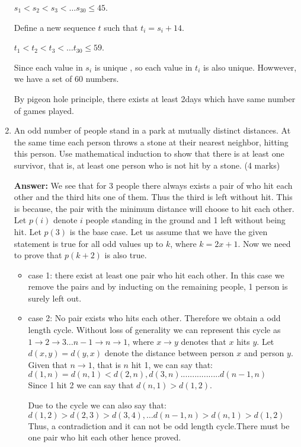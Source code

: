 \documentclass[a4paper]{article}
\begin{document}
\begin{enumerate}
$s_1 < s_2 < s_3 < \dots s_30 \leq 45$.

Define a new sequence $t$ such that $t_i=s_i+14$.

$t_1 < t_2 < t_3 < \dots t_30 \leq 59$.

Since each value in $s_i$ is unique , so each value in $t_i$ is also unique. Howwever, we have a set of  60 numbers.

By pigeon hole principle, there exists at least 2days which have same number of games played.

\item An odd number of people stand  in a park  at  mutually distinct distances.
At the  same time  each person  throws  a stone  at  their  nearest  neighbor, hitting this  person.  Use mathematical induction to show that there  is at least  one survivor,  that is, at  least  one person  who is not  hit  by a stone. (4 marks)

\textbf{Answer:}
We see that for 3 people there always exists a pair of who hit each other and the third hits one of them. Thus the third is left without hit. This is because, the pair with the minimum distance will choose to hit each other.
Let $p(i)$ denote $i$ people standing in the ground and 1 left without being hit. Let $p(3)$ is the base case.
Let us assume that we have the given statement is true for all odd values up to $k$, where $k=2x+1$. 
Now we need to prove that $p(k+2)$ is also true.
\begin{itemize}
\item case 1: there exist at least one pair who hit each other.
In this case we remove the pairs and by inducting on the remaining people, 1 person is surely left out.
\item case 2: No pair exists who hits each other. Therefore we obtain a odd length cycle. Without loss of generality we can represent this cycle as $1 \rightarrow 2 \rightarrow 3 \dots n-1 \rightarrow n \rightarrow 1$, where $x \rightarrow y$ denotes that $x$ hits $y$. Let $d(x,y)=d(y,x)$ denote the distance between person $x$ and person $y$.
Given that $n \rightarrow 1$, that is $n$ hit 1, we can say that:\\
$d(1,n)=d(n,1) < d(2,n),d(3,n).................d(n-1,n)$\\
Since 1 hit 2 we can say that $d(n,1)>d(1,2)$.
 
Due to the cycle we can also say that:
$d(1,2) > d(2,3) > d(3,4), \dots d(n-1,n) > d(n,1) > d(1,2)$
Thus, a contradiction and it can not be odd length cycle.There must be one pair who hit each other hence proved.
\end{itemize}

\end{enumerate}
\end{document}
